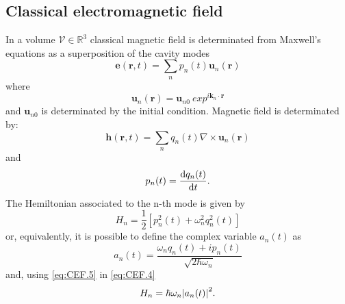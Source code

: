         \subsection{Classical electromagnetic field}
            In a volume $\mathcal{V}\in\mathbb{R}^3$ classical magnetic field is 
            determinated from Maxwell's equations as a superposition of the cavity modes
            \begin{equation}
                \mathbf{e}(\mathbf{r},t)=\sum_n p_n (t)\mathbf{u}_n (\mathbf{r})
                \label{eq:CEF.1}
            \end{equation}
            where
            \begin{equation*}
                \mathbf{u}_n (\mathbf{r})=\mathbf{u}_{n0}\ exp^{i\mathbf{k}_n \cdot \mathbf{r}}
            \end{equation*}
            and $\mathbf{u}_{n0}$ is determinated by the initial condition.
            Magnetic field is determinated by:
            \begin{equation}
                \mathbf{h}(\mathbf{r},t)=\sum_n q_n (t)\nabla\times\mathbf{u}_n (\mathbf{r})
                \label{eq:CEF.2}
            \end{equation}
            and
            \begin{equation}
                p_n (t)=\derivative{q_n (t)}{t} .
                \label{eq:CEF.3}
            \end{equation}
            The Hemiltonian associated to the n-th mode is given by
            \begin{equation}
                H_n=\frac{1}{2}[p_n^2(t)+\omega_n^2q_n^2(t)]
                \label{eq:CEF.4}
            \end{equation}
            or, equivalently, it is possible to define the complex variable $a_n(t)$ as
            \begin{equation}
                a_n(t)=\frac{\omega_nq_n(t)+ip_n(t)}{\sqrt{2\hbar\omega_n}}
                \label{eq:CEF.5}
            \end{equation}
            and, using \ref{eq:CEF.5} in \ref{eq:CEF.4}
            \begin{equation}
                H_n=\hbar\omega_n\absolutevalue{a_n(t)}^2.
                \label{eq_CEF.6}
            \end{equation}

